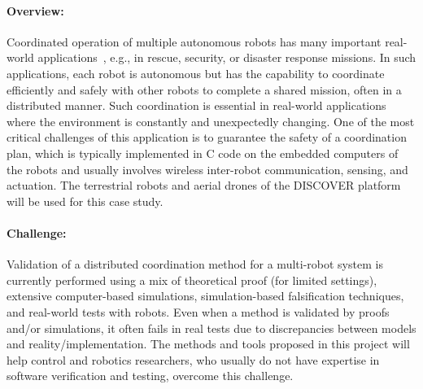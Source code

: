 
\paragraph{Overview:}

Coordinated operation of multiple autonomous robots %
has many important real-world applications~\cite{multirobot2005,multirobotsurvey2013}, e.g., in rescue, security, or disaster response missions. %
In such applications, each robot is autonomous but has the capability to coordinate efficiently and safely with other robots to complete a shared mission, often in a distributed manner. %
Such coordination is essential in real-world applications where the environment is constantly and unexpectedly changing.
One of the most critical challenges of this application is to guarantee the safety of a coordination plan, which is typically implemented in C code on the embedded computers of the robots and usually involves wireless inter-robot communication, sensing, and actuation.
The terrestrial robots and aerial drones of the DISCOVER platform will be used for this case study.


\paragraph{Challenge:}
Validation of a distributed coordination method for a multi-robot system is currently performed using a mix of theoretical proof (for limited settings), extensive computer-based simulations, simulation-based falsification techniques, and real-world tests with robots.
Even when a method is validated by proofs and/or simulations, it often fails in real tests due to discrepancies between models and reality/implementation.
The methods and tools proposed in this project will help control and robotics researchers, who usually do not have expertise in software verification and testing, overcome this challenge.


